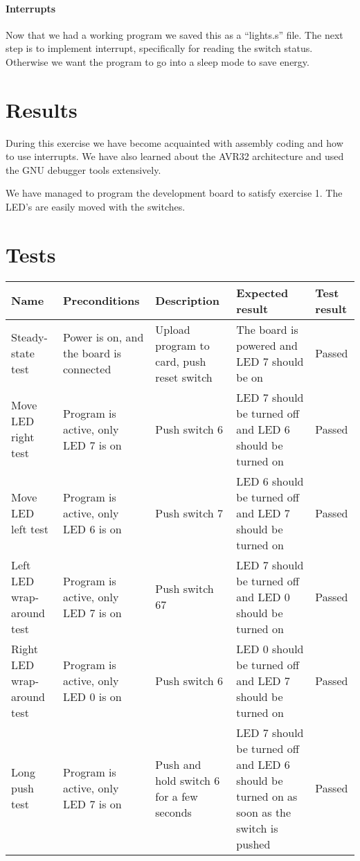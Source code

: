 \documentclass[a4paper,11pt]{article}
\begin{document}
\paragraph{Interrupts}
Now that we had a working program we saved this as a “lights.s” file. The next step is to implement interrupt, specifically for reading the switch status. Otherwise we want the program to go into a sleep mode to save energy. 

\section{Results}
During this exercise we have become acquainted with assembly coding and how to use interrupts. We have also learned about the AVR32 architecture and used the GNU debugger tools extensively. 

We have managed to program the development board to satisfy exercise 1. The LED's are easily moved with the switches.

\section{Tests}
\renewcommand{\arraystretch}{1.5} %
\begin{tabular}[pos]{|m{70pt}|m{90pt}|m{90pt}|m{100pt}|m{60pt}|}
\hline
\textbf{Name} 				& \textbf{Preconditions}				& \textbf{Description} 					& \textbf{Expected result} 													& \textbf{Test result} 		\\ \hline

Steady-state test			& Power is on, and the board is connected & Upload program to card, push reset switch 	& The board is powered and LED 7 should be on 									& Passed 				\\ \hline

Move LED right test			& Program is active, only LED 7 is on 		& Push switch 6						 	& LED 7 should be turned off and LED 6 should be turned on 							& Passed 				\\ \hline

Move LED left test			& Program is active, only LED 6 is on 		& Push switch 7						 	& LED 6 should be turned off and LED 7 should be turned on 							& Passed 				\\ \hline

Left LED wrap-around test		& Program is active, only LED 7 is on 		& Push switch 67					 	& LED 7 should be turned off and LED 0 should be turned on 							& Passed 				\\ \hline

Right LED wrap-around test	& Program is active, only LED 0 is on 		& Push switch 6						 	& LED 0 should be turned off and LED 7 should be turned on 							& Passed 				\\ \hline

Long push test				& Program is active, only LED 7 is on 		& Push and hold switch 6 for a few seconds 	& LED 7 should be turned off and LED 6 should be turned on as soon as the switch is pushed 	& Passed 				\\ \hline
\end{tabular}
\end{document}
